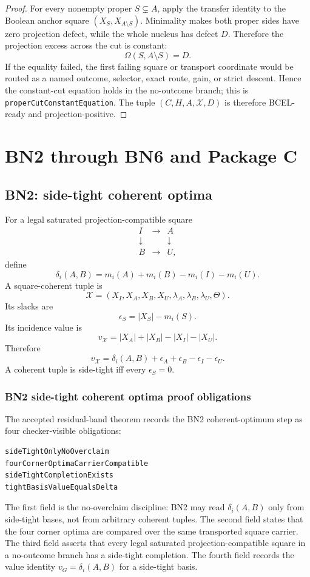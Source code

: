 \documentclass[10.5pt,a4paper]{article}
\begin{document}
\begin{proof}
For every nonempty proper \(S\subsetneq A\), apply the transfer identity to the Boolean anchor square \((X_S,X_{A\setminus S})\).  Minimality makes both proper sides have zero projection defect, while the whole nucleus has defect \(D\).  Therefore the projection excess across the cut is constant:
\[
 \Omega(S,A\setminus S)=D.
\]
If the equality failed, the first failing square or transport coordinate would be routed as a named outcome, selector, exact route, gain, or strict descent.  Hence the constant-cut equation holds in the no-outcome branch; this is \texttt{properCutConstantEquation}.  The tuple \((C,H,A,\mathcal X,D)\) is therefore BCEL-ready and projection-positive.
\end{proof}

\section{BN2 through BN6 and Package C}

\subsection{BN2: side-tight coherent optima}
For a legal saturated projection-compatible square
\[
\begin{array}{ccc}
I & \longrightarrow & A\\
\downarrow & & \downarrow\\
B & \longrightarrow & U,
\end{array}
\]
define
\[
\delta_i(A,B)=m_i(A)+m_i(B)-m_i(I)-m_i(U).
\]
A square-coherent tuple is
\[
\mathcal X=(X_I,X_A,X_B,X_U,\lambda_A,\lambda_B,\lambda_U,\Theta).
\]
Its slacks are
\[
\epsilon_S=|X_S|-m_i(S).
\]
Its incidence value is
\[
v_{\mathcal X}=|X_A|+|X_B|-|X_I|-|X_U|.
\]
Therefore
\[
v_{\mathcal X}=\delta_i(A,B)+\epsilon_A+\epsilon_B-\epsilon_I-\epsilon_U.
\]
A coherent tuple is side-tight iff every \(\epsilon_S=0\).

\subsubsection{BN2 side-tight coherent optima proof obligations}
The accepted residual-band theorem records the BN2 coherent-optimum step as four checker-visible obligations:
\begin{lstlisting}
sideTightOnlyNoOverclaim
fourCornerOptimaCarrierCompatible
sideTightCompletionExists
tightBasisValueEqualsDelta
\end{lstlisting}
The first field is the no-overclaim discipline: BN2 may read \(\delta_i(A,B)\) only from side-tight bases, not from arbitrary coherent tuples.  The second field states that the four corner optima are compared over the same transported square carrier.  The third field asserts that every legal saturated projection-compatible square in a no-outcome branch has a side-tight completion.  The fourth field records the value identity \(v_G=\delta_i(A,B)\) for a side-tight basis.
\end{document}

